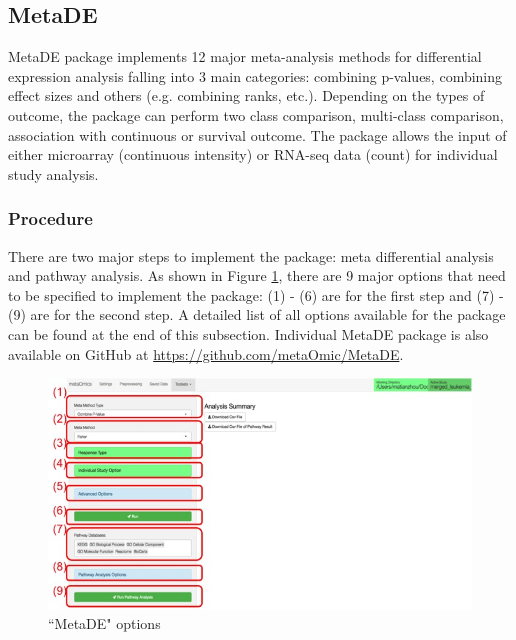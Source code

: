 \subsection{MetaDE}

MetaDE package implements 12 major meta-analysis methods for differential expression analysis falling into 3 main categories: combining p-values, combining effect sizes and others (e.g. combining ranks, etc.). Depending on the types of outcome, the package can perform two class comparison, multi-class comparison, association with continuous or survival outcome. The package allows the input of either microarray (continuous intensity) or RNA-seq data (count) for individual study analysis. 

\subsubsection{Procedure}

There are two major steps to implement the package: meta differential analysis and pathway analysis. As shown in Figure \ref{fig:MetaDEoption}, there are 9 major options that need to be specified to implement the package: (1) - (6) are for the first step and (7) - (9) are for the second step. A detailed list of all options available for the package can be found at the end of this subsection. Individual MetaDE package is also available on GitHub at \url{https://github.com/metaOmic/MetaDE}. \\

\begin{figure}[H]
\begin{center}
\includegraphics[scale=0.45]{./figure/metaDE/metaDEoption.jpg}
\caption{``MetaDE" options}
\label{fig:MetaDEoption}
\end{center}
\end{figure}

